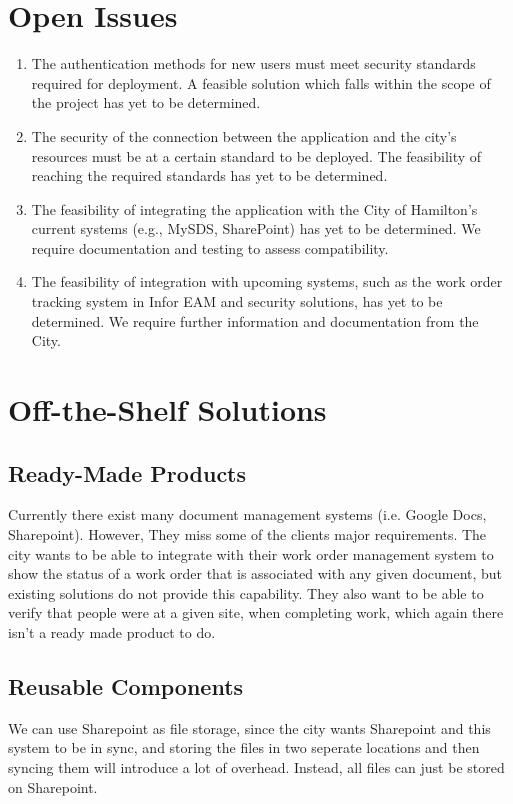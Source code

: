 \documentclass[12pt]{article}
\begin{document}
\section{Open Issues}
\begin{enumerate}
  \item The authentication methods for new users must meet security
    standards required for deployment. A feasible solution which
    falls within the scope of the project has yet to be determined.
  \item The security of the connection between the application and
    the city's resources must be at a certain standard to be
    deployed. The feasibility of reaching the required standards has
    yet to be determined.
  \item The feasibility of integrating the application with the City
    of Hamilton's current systems (e.g., MySDS, SharePoint) has yet
    to be determined. We require documentation and testing to assess
    compatibility.
  \item The feasibility of integration with upcoming systems, such as
    the work order tracking system in Infor EAM and security
    solutions, has yet to be determined. We require further
    information and documentation from the City.
\end{enumerate}

\section{Off-the-Shelf Solutions}
\subsection{Ready-Made Products}
Currently there exist many document management systems (i.e. Google Docs,
Sharepoint). However, They miss some of the clients major requirements. The
city wants to be able to integrate with their work order management system to
show the status of a work order that is associated with any given document,
but existing solutions do not provide this capability. They also want to be
able to verify that people were at a given site, when completing work, which
again there isn't a ready made product to do.
\subsection{Reusable Components}
We can use Sharepoint as file storage, since the city wants Sharepoint and this
system to be in sync, and storing the files in two seperate locations and then
syncing them will introduce a lot of overhead. Instead, all files can just be
stored on Sharepoint.
\end{document}
